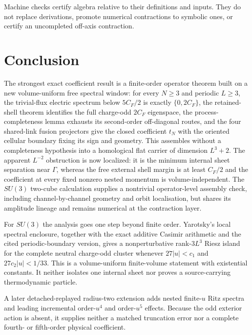 \documentclass[11pt]{article}
\theoremstyle{plain}
\theoremstyle{definition}
\theoremstyle{remark}
\begin{document}
Machine checks certify algebra relative to their definitions and inputs. They
do not replace derivations, promote numerical contractions to symbolic ones,
or certify an uncompleted off-axis contraction.

\section{Conclusion}

The strongest exact coefficient result is a finite-order operator theorem built
on a new volume-uniform free spectral window: for every $N\ge3$ and periodic $L\ge3$,
the trivial-flux electric spectrum below $5C_F/2$ is exactly $\{0,2C_F\}$,
the retained-shell theorem identifies the full charge-odd $2C_F$ eigenspace,
the process-completeness lemma exhausts its second-order off-diagonal routes,
and the four shared-link fusion projectors give the closed coefficient $t_N$
with the oriented cellular boundary fixing its sign and geometry. This
assembles without a completeness hypothesis into a homological flat carrier
of dimension $L^3+2$. The apparent $L^{-2}$ obstruction is now localized:
it is the minimum internal sheet separation near $\Gamma$, whereas the free
external shell margin is at least $C_F/2$ and the coefficient at every fixed
nonzero nested momentum is volume-independent. The $SU(3)$
two-cube calculation supplies a
nontrivial operator-level assembly check, including channel-by-channel
geometry and orbit localisation, but shares its amplitude lineage and remains
numerical at the contraction layer.

For $SU(3)$ the analysis goes one step beyond finite order. Yarotsky's local
spectral enclosure, together with the exact additive Casimir arithmetic and
the cited periodic-boundary version, gives a nonperturbative rank-$3L^3$ Riesz island
for the complete neutral charge-odd cluster whenever
$27|u|<c_1$ and $27c_2|u|<1/33$. This is a volume-uniform finite-volume
statement with existential constants. It neither isolates one internal sheet
nor proves a source-carrying thermodynamic particle.

A later detached-replayed radius-two extension adds nested finite-$u$ Ritz
spectra and leading incremental order-$u^4$ and order-$u^5$ effects. Because
the odd exterior action is absent, it supplies neither a matched truncation
error nor a complete fourth- or fifth-order physical coefficient.
\end{document}
